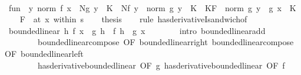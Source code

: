 \begin{isabellebody}
\ \ \isamarkupfalse%
\ {\isacharquery}{\kern0pt}fun{}\ {\isacharequal}{\kern0pt}\ {\isachardoublequoteopen}{\isasymlambda}y{\isachardot}{\kern0pt}\ norm\ {\isacharparenleft}{\kern0pt}f\ x{\isacharparenright}{\kern0pt}\ {\isacharasterisk}{\kern0pt}\ Ng\ y\ {\isacharasterisk}{\kern0pt}\ K\ {\isacharplus}{\kern0pt}\ Nf\ y\ {\isacharasterisk}{\kern0pt}\ norm\ {\isacharparenleft}{\kern0pt}g\ y{\isacharparenright}{\kern0pt}\ {\isacharasterisk}{\kern0pt}\ K\ {\isacharplus}{\kern0pt}\ KF\ {\isacharasterisk}{\kern0pt}\ norm\ {\isacharparenleft}{\kern0pt}g\ y\ {\isacharminus}{\kern0pt}\ g\ x{\isacharparenright}{\kern0pt}\ {\isacharasterisk}{\kern0pt}\ K{\isachardoublequoteclose}\isanewline
\ \ \isamarkupfalse%
\ {\isacharquery}{\kern0pt}F\ {\isacharequal}{\kern0pt}\ {\isachardoublequoteopen}at\ x\ within\ s{\isachardoublequoteclose}\isanewline
\isanewline
\ \ \isamarkupfalse%
\ {\isacharquery}{\kern0pt}thesis\isanewline
\ \ \isamarkupfalse%
\ {\isacharparenleft}{\kern0pt}rule\ has{\isacharunderscore}{\kern0pt}derivativeI{\isacharunderscore}{\kern0pt}sandwich{\isacharbrackleft}{\kern0pt}of\ {}{\isacharbrackright}{\kern0pt}{\isacharparenright}{\kern0pt}\isanewline
\ \ \ \ \isamarkupfalse%
\ {\isachardoublequoteopen}bounded{\isacharunderscore}{\kern0pt}linear\ {\isacharparenleft}{\kern0pt}{\isasymlambda}h{\isachardot}{\kern0pt}\ f\ x\ {\isacharasterisk}{\kern0pt}{\isacharasterisk}{\kern0pt}\ g{\isacharprime}{\kern0pt}\ h\ {\isacharplus}{\kern0pt}\ f{\isacharprime}{\kern0pt}\ h\ {\isacharasterisk}{\kern0pt}{\isacharasterisk}{\kern0pt}\ g\ x{\isacharparenright}{\kern0pt}{\isachardoublequoteclose}\isanewline
\ \ \ \ \ \ \isamarkupfalse%
\ {\isacharparenleft}{\kern0pt}intro\ bounded{\isacharunderscore}{\kern0pt}linear{\isacharunderscore}{\kern0pt}add\isanewline
\ \ \ \ \ \ \ \ bounded{\isacharunderscore}{\kern0pt}linear{\isacharunderscore}{\kern0pt}compose\ {\isacharbrackleft}{\kern0pt}OF\ bounded{\isacharunderscore}{\kern0pt}linear{\isacharunderscore}{\kern0pt}right{\isacharbrackright}{\kern0pt}\ bounded{\isacharunderscore}{\kern0pt}linear{\isacharunderscore}{\kern0pt}compose\ {\isacharbrackleft}{\kern0pt}OF\ bounded{\isacharunderscore}{\kern0pt}linear{\isacharunderscore}{\kern0pt}left{\isacharbrackright}{\kern0pt}\isanewline
\ \ \ \ \ \ \ \ has{\isacharunderscore}{\kern0pt}derivative{\isacharunderscore}{\kern0pt}bounded{\isacharunderscore}{\kern0pt}linear\ {\isacharbrackleft}{\kern0pt}OF\ g{\isacharbrackright}{\kern0pt}\ has{\isacharunderscore}{\kern0pt}derivative{\isacharunderscore}{\kern0pt}bounded{\isacharunderscore}{\kern0pt}linear\ {\isacharbrackleft}{\kern0pt}OF\ f{\isacharbrackright}{\kern0pt}{\isacharparenright}{\kern0pt}\isanewline

\end{isabellebody}
